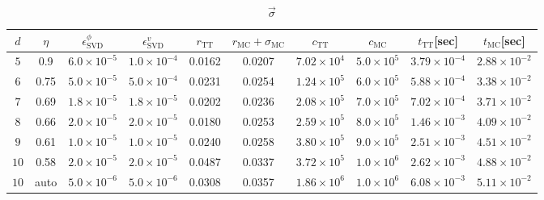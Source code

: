\begin{table*}[htbp]
\begin{subtable}[h]{0.9\textwidth}
\centering
\caption{$\vec{\sigma}$}
\begin{tabular}{|c|c|c|c|c|c|c|c|c|c|}
    \hline
    $d$ & $\eta$ & $\epsilon_{\mathrm{SVD}}^\phi$ & $\epsilon_{\mathrm{SVD}}^v$ & $r_{\mathrm{TT}}$ & $r_{\mathrm{MC}} + \sigma_{\text{MC}}$ & {$c_{\mathrm{TT}}$} & {$c_{\mathrm{MC}}$} & {$t_{\mathrm{TT}}$[sec]} & {$t_{\mathrm{MC}}$[sec]}  \\
    \hline
    $5$ & 0.9 & $6.0 \times 10^{-5}$ & $1.0 \times 10^{-4}$ & 0.0162 & 0.0207 & $7.02 \times 10^4$ & $5.0 \times 10^5$ & $3.79 \times 10^{-4}$ & $2.88 \times 10^{-2}$ \\
    \hline
    $6$ & 0.75 & $5.0 \times 10^{-5}$ & $5.0 \times 10^{-4}$ & 0.0231 & 0.0254 & $1.24 \times 10^5$ & $6.0 \times 10^5$ & $5.88 \times 10^{-4}$ & $3.38 \times 10^{-2}$ \\
    \hline
    $7$ & 0.69 & $1.8 \times 10^{-5}$ & $1.8 \times 10^{-5}$ & 0.0202 & 0.0236 & $2.08 \times 10^5$ & $7.0 \times 10^5$ & $7.02 \times 10^{-4}$ & $3.71 \times 10^{-2}$  \\
    \hline
    $8$ & 0.66 & $2.0 \times 10^{-5}$ & $2.0 \times 10^{-5}$ & 0.0180 & 0.0253 & $2.59 \times 10^5$ & $8.0 \times 10^5$ & $1.46 \times 10^{-3}$ & $4.09 \times 10^{-2}$ \\
    \hline
    $9$ & 0.61 & $1.0 \times 10^{-5}$ & $1.0 \times 10^{-5}$ & 0.0240 & 0.0258 & $3.80 \times 10^5$ & $9.0 \times 10^5$ & $2.51 \times 10^{-3}$ & $4.51 \times 10^{-2}$ \\
    \hline
    $10$ & 0.58 & $2.0 \times 10^{-5}$ & $2.0 \times 10^{-5}$ & 0.0487 & 0.0337 & $3.72 \times 10^5$ & $1.0 \times 10^6$ & $2.62 \times 10^{-3}$ & $4.88 \times 10^{-2}$ \\
    \hline
    $10$ & auto & $5.0 \times 10^{-6}$ & $5.0 \times 10^{-6}$ & 0.0308 & 0.0357 & $1.86 \times 10^6$ & $1.0 \times 10^6$ & $6.08 \times 10^{-3}$ & $5.11 \times 10^{-2}$ \\
    \hline
\end{tabular}
\end{subtable}

\vspace{10pt}    


\end{table*}
